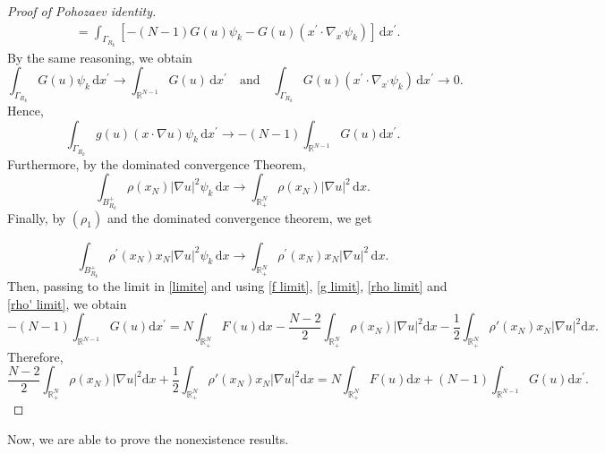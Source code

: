 \documentclass[12pt,reqno]{amsart}
\begin{document}
\begin{proof}[Proof of Pohozaev identity]
$$\begin{aligned}
		&=\int_{\Gamma_{R_k}}\left[-(N-1)G(u)\psi_k-G(u)\left(x^\prime\cdot
		\nabla_{x^\prime}\psi_k\right)\right]\,\mathrm{d}x^\prime.
		\end{aligned}
		$$
		By the same reasoning, we obtain
		$$
\int_{\Gamma_{R_k}}G(u)\psi_k\,\mathrm{d}x^\prime\longrightarrow \int_{\mathds{R}^{N-1}}G(u)\,\mathrm{d}x^\prime\quad\mbox{and}\quad \int_{\Gamma_{R_k}}G(u)\left(x^\prime\cdot
		\nabla_{x^\prime}\psi_k\right)\,\mathrm{d}x^\prime\longrightarrow 0.
		$$
Hence,
\begin{equation}\label{g limit}
    \int_{\Gamma_{R_k}}g(u)(x\cdot\nabla u) \psi_k\,\mathrm{d}x^\prime \longrightarrow -(N-1)\int_{\mathds{R}^{N-1}}G(u)\mathrm{d}x^\prime.
\end{equation}
		Furthermore, by the dominated convergence Theorem,
		\begin{equation}\label{rho limit}
		\int_{B_{R_k}^+}\rho(x_N)|\nabla u|^2\psi_k\,\mathrm{d}x\longrightarrow\int_{\mathds{R}^N_+}\rho(x_N)|\nabla u|^2\,\mathrm{d}x.
		\end{equation}
        Finally, by $(\rho_1)$ and the dominated convergence theorem, we get
        
        \begin{equation}\label{rho' limit}
            \int_{B_{R_k}^+}\rho^\prime(x_N)x_N|\nabla u|^2\psi_k\,\mathrm{d}x\longrightarrow\int_{\mathds{R}^N_+}\rho^\prime(x_N)x_N|\nabla u|^2\,\mathrm{d}x.
        \end{equation}
Then, passing to the limit in \eqref{limite} and using \eqref{f limit}, \eqref{g limit}, \eqref{rho limit} and \eqref{rho' limit}, we obtain
\begin{equation*}
    -(N-1)\int_{\mathds{R}^{N-1}}G(u)\mathrm{d}x^\prime=N\int_{\mathds{R}^N_+}F(u)\mathrm{d}x-\frac{N-2}{2}\int_{\mathds{R}^N_+}\rho(x_N)|\nabla u|^2\mathrm{d}x-\frac{1}{2}\int_{\mathds{R}^N_+}\rho'(x_N)x_N |\nabla u|^2\mathrm{d}x.
\end{equation*}
Therefore,
\begin{equation*}
    \frac{N-2}{2}\int_{\mathds{R}_{+}^{N}}\rho(x_N)|\nabla u|^2\mathrm{d}x+\frac{1}{2}\int_{\mathds{R}_{+}^{N}}\rho'(x_N)x_N|\nabla u|^2\mathrm{d}x=N\int_{\mathds{R}^N_+}F(u)\mathrm{d}x+(N-1)\int_{\mathds{R}^{N-1}}G(u)\mathrm{d}x^\prime.
\end{equation*}

\end{proof}

Now, we are able to prove the nonexistence results.
\end{document}
